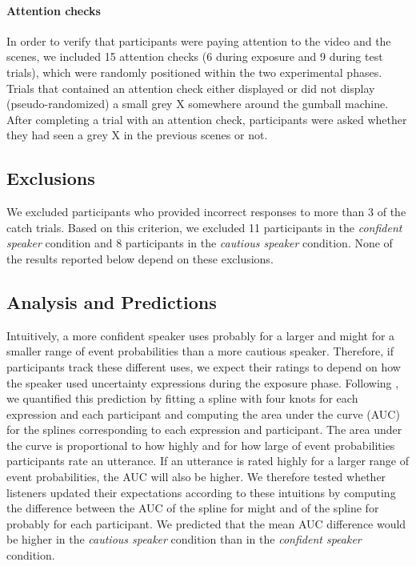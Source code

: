 \documentclass[lucida,biblatex]{sp} %
\begin{document}
\paragraph{Attention checks}  In order to verify that participants were paying attention to the video and the scenes, we included 15 attention checks (6 during exposure and 9 during test trials), which were randomly positioned within the two experimental phases. Trials that contained an attention check either displayed or did not display (pseudo-randomized) a small grey X somewhere around the gumball machine. After completing a trial with an attention check, participants were asked whether they had seen a grey X in the previous scenes or not.

\subsection{Exclusions} We excluded participants who provided incorrect responses to more than 3 of the catch trials. Based on this criterion, we excluded 11 participants in the \textit{confident speaker} condition and 8 participants in the \textit{cautious speaker} condition. None of the results reported below depend on these exclusions.


\subsection{Analysis and Predictions}  

Intuitively, a more confident speaker uses {\sc probably} for a larger and {\sc might} for a smaller range of event probabilities than a more cautious speaker. 
Therefore, if participants track these different uses, we expect their ratings to depend on how the speaker used uncertainty expressions during the exposure phase. 
Following \cite{Yildirim2016}, we quantified this prediction by fitting a spline with four knots for each expression and each participant and computing the area 
under the curve (AUC) for the splines corresponding to each expression and participant. The area under the curve is proportional to how highly and for how large 
of event probabilities participants rate an utterance. If an utterance is rated highly for a larger range of event probabilities, the AUC will also be higher. 
We therefore tested whether listeners updated their expectations according to these intuitions by computing the difference between the AUC of the spline for 
{\sc might} and of the spline for {\sc probably} for each participant. We predicted that the mean AUC difference would be higher in the 
\emph{cautious speaker} condition than in the \emph{confident speaker} condition.
\end{document}

